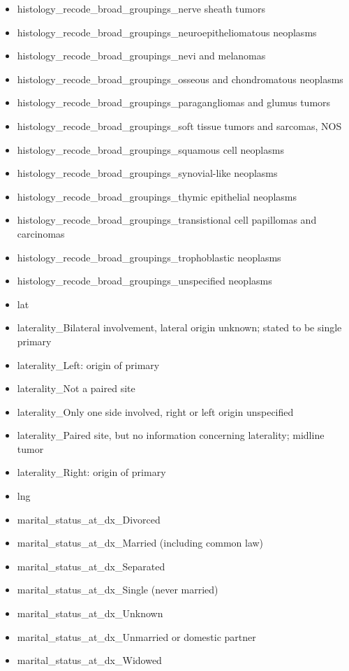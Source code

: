 \documentclass[10pt,letterpaper]{article}
\begin{document}
\begin{itemize}[noitemsep]
\item histology\_recode\_broad\_groupings\_nerve sheath tumors
\item histology\_recode\_broad\_groupings\_neuroepitheliomatous neoplasms
\item histology\_recode\_broad\_groupings\_nevi and melanomas
\item histology\_recode\_broad\_groupings\_osseous and chondromatous neoplasms
\item histology\_recode\_broad\_groupings\_paragangliomas and glumus tumors
\item histology\_recode\_broad\_groupings\_soft tissue tumors and sarcomas, NOS
\item histology\_recode\_broad\_groupings\_squamous cell neoplasms
\item histology\_recode\_broad\_groupings\_synovial-like neoplasms
\item histology\_recode\_broad\_groupings\_thymic epithelial neoplasms
\item histology\_recode\_broad\_groupings\_transistional cell papillomas and carcinomas
\item histology\_recode\_broad\_groupings\_trophoblastic neoplasms
\item histology\_recode\_broad\_groupings\_unspecified neoplasms
\item lat
\item laterality\_Bilateral involvement, lateral origin unknown; stated to be single primary
\item laterality\_Left: origin of primary
\item laterality\_Not a paired site
\item laterality\_Only one side involved, right or left origin unspecified
\item laterality\_Paired site, but no information concerning laterality; midline tumor
\item laterality\_Right: origin of primary
\item lng
\item marital\_status\_at\_dx\_Divorced
\item marital\_status\_at\_dx\_Married (including common law)
\item marital\_status\_at\_dx\_Separated
\item marital\_status\_at\_dx\_Single (never married)
\item marital\_status\_at\_dx\_Unknown
\item marital\_status\_at\_dx\_Unmarried or domestic partner
\item marital\_status\_at\_dx\_Widowed

\end{itemize}
\end{document}
